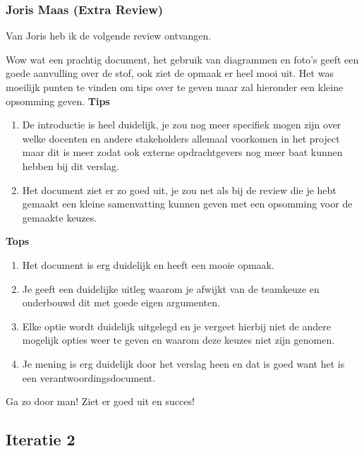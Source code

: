 \documentclass[a4paper]{report}
\begin{document}
\subsubsection{Joris Maas (Extra Review)}
Van Joris heb ik de volgende review ontvangen.
\par\smallskip 
Wow wat een prachtig document, het gebruik van diagrammen en foto’s geeft een goede aanvulling over de stof, ook ziet de opmaak er heel mooi uit. Het was moeilijk punten te vinden om tips over te geven maar zal hieronder een kleine opsomming geven.
\textbf{Tips}
\begin{enumerate}
  \item De introductie is heel duidelijk, je zou nog meer specifiek mogen zijn over welke docenten en andere stakeholders allemaal voorkomen in het project maar dit is meer zodat ook externe opdrachtgevers nog meer baat kunnen hebben bij dit verslag.
  \item Het document ziet er zo goed uit, je zou net als bij de review die je hebt gemaakt een kleine samenvatting kunnen geven met een opsomming voor de gemaakte keuzes.
\end{enumerate}
\textbf{Tops}
\begin{enumerate}
  \item Het document is erg duidelijk en heeft een mooie opmaak.
  \item Je geeft een duidelijke uitleg waarom je afwijkt van de teamkeuze en onderbouwd dit met goede eigen argumenten.
  \item Elke optie wordt duidelijk uitgelegd en je vergeet hierbij niet de andere mogelijk opties weer te geven en waarom deze keuzes niet zijn genomen.
  \item Je mening is erg duidelijk door het verslag heen en dat is goed want het is een verantwoordingsdocument.
\end{enumerate}

Ga zo door man! Ziet er goed uit en succes!

\subsection{Iteratie 2}
\end{document}
